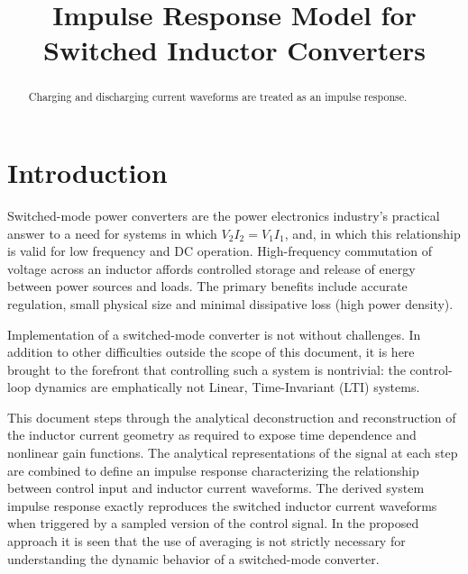 \documentclass[conference]{IEEEtran}
\begin{document}
\title{Impulse Response Model for Switched Inductor Converters\\}

\author{
\and
{}
}


\maketitle

\begin{abstract}
Charging and discharging current waveforms are treated as an impulse response.
\end{abstract}


\section{Introduction}
Switched-mode power converters are the power electronics industry's practical answer to a need for systems in which $V_{2} I_{2} = V_{1} I_{1}$, and, in which this relationship is valid for low frequency and DC operation. High-frequency commutation of voltage across an inductor affords controlled storage and release of energy between power sources and loads.  The primary benefits include accurate regulation, small physical size and minimal dissipative loss (high power density). 

Implementation of a switched-mode converter is not without challenges. In addition to other difficulties outside the scope of this document, it is here brought to the forefront that controlling such a system is nontrivial: the control-loop dynamics are emphatically not Linear, Time-Invariant (LTI) systems.

This document steps through the analytical deconstruction and reconstruction of the inductor current geometry as required to expose time dependence and nonlinear gain functions. The analytical representations of the signal at each step are combined to define an impulse response characterizing the relationship between control input and inductor current waveforms.  The derived system impulse response exactly reproduces the switched inductor current waveforms when triggered by a sampled version of the control signal. In the proposed approach it is seen that the use of averaging is not strictly necessary for understanding the dynamic behavior of a switched-mode converter.
\end{document}
